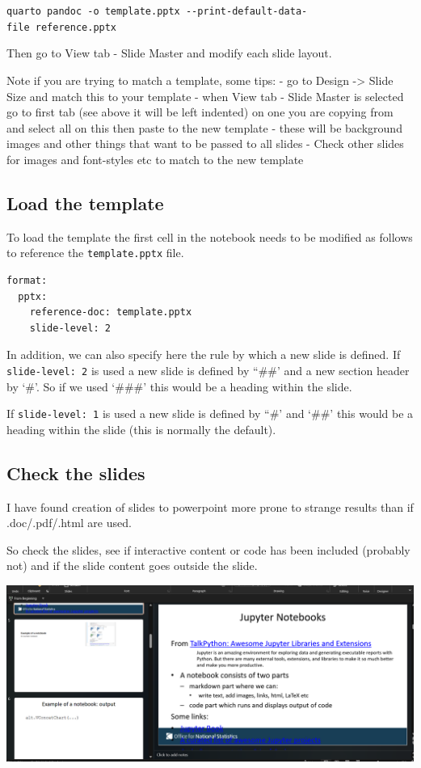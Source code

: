 \documentclass[
  letterpaper,
  DIV=11,
  numbers=noendperiod]{scrartcl}
\begin{document}
\texttt{quarto\ pandoc\ -o\ template.pptx\ -\/-print-default-data-file\ reference.pptx}

Then go to View tab - Slide Master and modify each slide layout.

Note if you are trying to match a template, some tips: - go to Design
-\textgreater{} Slide Size and match this to your template - when View
tab - Slide Master is selected go to first tab (see above it will be
left indented) on one you are copying from and select all on this then
paste to the new template - these will be background images and other
things that want to be passed to all slides - Check other slides for
images and font-styles etc to match to the new template

\hypertarget{load-the-template}{%
\subsection{Load the template}\label{load-the-template}}

To load the template the first cell in the notebook needs to be modified
as follows to reference the \texttt{template.pptx} file.

\begin{verbatim}
format:
  pptx:
    reference-doc: template.pptx
    slide-level: 2
\end{verbatim}

In addition, we can also specify here the rule by which a new slide is
defined. If \texttt{slide-level:\ 2} is used a new slide is defined by
``\#\#' and a new section header by `\#'. So if we used `\#\#\#' this
would be a heading within the slide.

If \texttt{slide-level:\ 1} is used a new slide is defined by ``\#' and
`\#\#' this would be a heading within the slide (this is normally the
default).

\hypertarget{check-the-slides}{%
\subsection{Check the slides}\label{check-the-slides}}

I have found creation of slides to powerpoint more prone to strange
results than if .doc/.pdf/.html are used.

So check the slides, see if interactive content or code has been
included (probably not) and if the slide content goes outside the slide.

\includegraphics{ghtop_images/ppt_eg.png}
\end{document}
